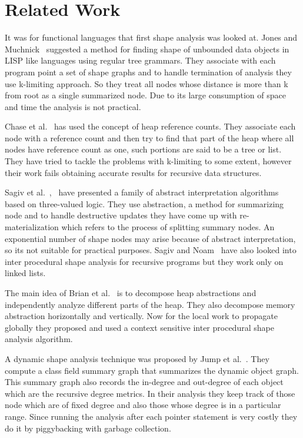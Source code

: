 \section{Related Work}
It was for functional languages that first shape analysis was looked at. Jones and Muchnick~\cite{Muchnick79} 
suggested a method for finding shape of unbounded data objects in LISP like
languages using regular tree grammars. They associate with each program point a set of 
shape graphs and to handle termination of analysis they use k-limiting approach. So they treat all nodes
whose distance is more than k from root as a single summarized node. Due to its large consumption of space 
and time the analysis is not practical.

Chase et al.~\cite{Chase90}  has used the concept of heap reference counts. They associate each node with a reference 
count and then try to find that part of the heap where all nodes
have reference count as one, such portions are said to be a tree or list. 
They have tried to tackle the problems with k-limiting to some extent, however their work fails obtaining 
accurate results for recursive data structures.

Sagiv et al.~\cite{Sagiv99},~\cite{Sagiv02} have presented a family of abstract interpretation algorithms based on three-valued logic. 
They use abstraction, a method for summarizing node and to handle destructive updates they have 
come up with re-materialization which refers to the process of splitting summary nodes. An exponential number of shape nodes may arise because of
abstract interpretation, so its not suitable for practical purposes. Sagiv and Noam~\cite{SagivInter02} have also looked into inter procedural shape 
analysis for recursive programs but they work only on linked lists. 

The main idea of Brian et al.~\cite{hackett05region} is to  decompose heap abstractions and independently analyze different parts of the heap.
They also decompose memory abstraction horizontally and vertically. Now for the local work to propagate globally they proposed 
and used a context sensitive inter procedural shape analysis algorithm.

A dynamic shape analysis technique was proposed by Jump et al.~\cite{maria09dynamic}. They compute a class field 
summary graph that summarizes the dynamic object graph. This summary graph also records the in-degree and out-degree of each 
object which are the recursive degree metrics. In their analysis they keep track of those node which are of fixed degree and
also those whose degree is in a particular range. Since running the analysis after each pointer statement is very costly they 
do it by piggybacking with garbage collection. 

